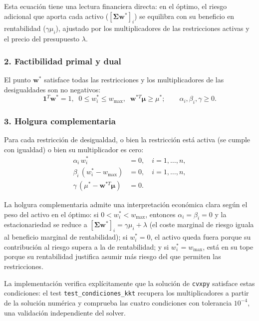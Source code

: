 Esta ecuación tiene una lectura financiera directa: en el óptimo, el riesgo
adicional que aporta cada activo ($[\boldsymbol{\Sigma} \mathbf{w}^*]_i$) se
equilibra con su beneficio en rentabilidad ($\gamma \mu_i$), ajustado por los
multiplicadores de las restricciones activas y el precio del presupuesto
$\lambda$.

\subsubsection*{2. Factibilidad primal y dual}

El punto $\mathbf{w}^*$ satisface todas las restricciones y los multiplicadores
de las desigualdades son no negativos:
\begin{equation}
    \mathbf{1}^T \mathbf{w}^* = 1, \;\;
    0 \le w_i^* \le w_{\max}, \;\;
    \mathbf{w}^{*T} \boldsymbol{\mu} \ge \mu^*;
    \qquad
    \alpha_i, \beta_i, \gamma \ge 0.
    \label{eq:kkt-primal}
\end{equation}

\subsubsection*{3. Holgura complementaria}

Para cada restricción de desigualdad, o bien la restricción está activa
(se cumple con igualdad) o bien su multiplicador es cero:
\begin{align}
    \alpha_i \, w_i^* &= 0, \quad i = 1, \dots, n,
        \label{eq:kkt-holgura1} \\
    \beta_i \, (w_i^* - w_{\max}) &= 0, \quad i = 1, \dots, n,
        \label{eq:kkt-holgura2} \\
    \gamma \, (\mu^* - \mathbf{w}^{*T} \boldsymbol{\mu}) &= 0.
        \label{eq:kkt-holgura3}
\end{align}

La holgura complementaria admite una interpretación económica clara según el
peso del activo en el óptimo: si $0 < w_i^* < w_{\max}$, entonces
$\alpha_i = \beta_i = 0$ y la estacionariedad se reduce a
$[\boldsymbol{\Sigma}\mathbf{w}^*]_i = \gamma\mu_i + \lambda$ (el coste marginal
de riesgo iguala al beneficio marginal de rentabilidad); si $w_i^* = 0$, el
activo queda fuera porque su contribución al riesgo supera a la de rentabilidad;
y si $w_i^* = w_{\max}$, está en su tope porque su rentabilidad justifica asumir
más riesgo del que permiten las restricciones.

La implementación verifica explícitamente que la solución de \texttt{cvxpy}
satisface estas condiciones: el test \texttt{test\_condiciones\_kkt} recupera
los multiplicadores a partir de la solución numérica y comprueba las cuatro
condiciones con tolerancia $10^{-4}$, una validación independiente del solver.

